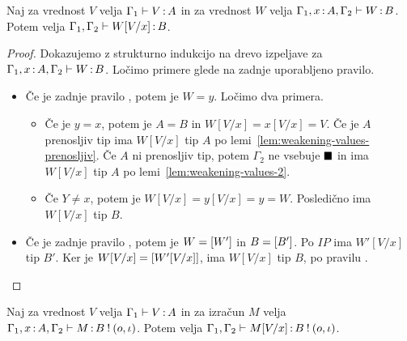 \begin{lema}\label{lem:substitucija-vrednosti-2}
	Naj za vrednost $V$ velja $\Gamma_1 \vdash V \mathinner{:} A$ in za vrednost $W$ velja $\Gamma_1, x \mathinner{:} A, \Gamma_2 \vdash W \mathinner{:} B$. Potem velja $\Gamma_1, \Gamma_2 \vdash W[V/x] \mathinner{:} B$.
\end{lema}

\begin{proof}
	Dokazujemo z strukturno indukcijo na drevo izpeljave za $\Gamma_1, x \mathinner{:} A, \Gamma_2 \vdash W \mathinner{:} B$.
	Ločimo primere glede na zadnje uporabljeno pravilo.
	
	\begin{itemize}
		\item Če je zadnje pravilo , potem je $W = y$.
		Ločimo dva primera.
		\begin{itemize}
			\item Če je $y = x$, potem je $A = B$ in $W[V/x] = x[V/x] = V$. Če je $A$ prenosljiv tip ima $W[V/x]$ tip $A$ po lemi~\ref{lem:weakening-values-prenosljiv}. Če $A$ ni prenosljiv tip, potem $\Gamma_2$ ne vsebuje $\blacksquare$ in ima $W[V/x]$ tip $A$ po lemi~\ref{lem:weakening-values-2}.
			
			\item Če $Y \neq x$, potem je $W[V/x] = y[V/x] = y = W$. Posledično ima $W[V/x]$ tip $B$.
		\end{itemize}
		
		\item Če je zadnje pravilo , potem je $W=[W']$ in $B=[B']$. Po $IP$ ima $W'[V/x]$ tip $B'$. Ker je $W[V/x] = [W'[V/x]]$, ima $W[V/x]$ tip $B$, po pravilu .
		
	\end{itemize}
\end{proof}

\begin{lema}\label{lem:substitucija-izračuni-2}
	Naj za vrednost $V$ velja $\Gamma_1 \vdash V \mathinner{:} A$ in za izračun $M$ velja $\Gamma_1, x \mathinner{:} A, \Gamma_2 \vdash M \mathinner{:} B \mathbin{!} (o, \iota)$. Potem velja $\Gamma_1, \Gamma_2 \vdash M[V/x] \mathinner{:} B \mathbin{!} (o, \iota)$.
\end{lema}

